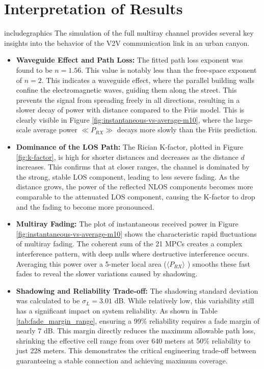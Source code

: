 \section{Interpretation of Results}includegraphics
The simulation of the full multiray channel provides several key insights into the behavior of the V2V communication link in an urban canyon.

\begin{itemize}
	\item \textbf{Waveguide Effect and Path Loss:} The fitted path loss exponent was found to be $n=1.56$. This value is notably less than the free-space exponent of $n=2$. This indicates a {waveguide effect}, where the parallel building walls confine the electromagnetic waves, guiding them along the street. This prevents the signal from spreading freely in all directions, resulting in a slower decay of power with distance compared to the Friis model. This is clearly visible in Figure \ref{fig:instantaneous-vs-average-m10}, where the large-scale average power $\ll P_{RX} \gg$ decays more slowly than the Friis prediction.
	
	\item \textbf{Dominance of the LOS Path:} The Rician K-factor, plotted in Figure \ref{fig:k-factor}, is high for shorter distances and decreases as the distance $d$ increases. This confirms that at closer ranges, the channel is dominated by the strong, stable LOS component, leading to less severe fading. As the distance grows, the power of the reflected NLOS components becomes more comparable to the attenuated LOS component, causing the K-factor to drop and the fading to become more pronounced.
	
	\item \textbf{Multiray Fading:} The plot of instantaneous received power in Figure \ref{fig:instantaneous-vs-average-m10} shows the characteristic rapid fluctuations of multiray fading. The coherent sum of the 21 MPCs creates a complex interference pattern, with deep nulls where destructive interference occurs. Averaging this power over a 5-meter local area ($\langle P_{RX} \rangle$ ) smooths these fast fades to reveal the slower variations caused by shadowing.
	
	\item \textbf{Shadowing and Reliability Trade-off:} The shadowing standard deviation was calculated to be $\sigma_L = 3.01$ dB. While relatively low, this variability still has a significant impact on system reliability. As shown in Table \ref{tab:fade_margin_range}, ensuring a 99\% reliability requires a fade margin of nearly 7 dB. This margin directly reduces the maximum allowable path loss, shrinking the effective cell range from over 640 meters at 50\% reliability to just 228 meters. This demonstrates the critical engineering trade-off between guaranteeing a stable connection and achieving maximum coverage.
\end{itemize}



